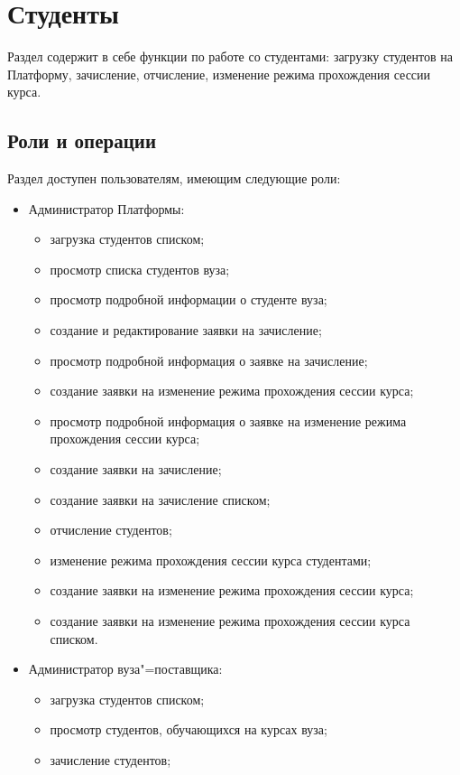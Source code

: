 \graphicspath{ {images/student/} }

\section{Студенты}

Раздел  содержит в себе функции по работе со студентами: загрузку студентов на Платформу, зачисление, 
отчисление, изменение режима прохождения сессии курса.

\subsection{Роли и операции}
Раздел доступен пользователям, имеющим следующие роли:
\begin{itemize}
	\item Администратор Платформы:
	\begin{itemize}
		\item загрузка студентов списком;
		\item просмотр списка студентов вуза;
		\item просмотр подробной информации о студенте вуза;
		\item создание и редактирование заявки на зачисление;
		\item просмотр подробной информация о заявке на зачисление;
		\item создание заявки на изменение режима прохождения сессии курса;
		\item просмотр подробной информация о заявке на изменение режима прохождения сессии курса;
		\item создание заявки на зачисление;
		\item создание заявки на зачисление списком;
		\item отчисление студентов;
		\item изменение режима прохождения сессии курса студентами;
		\item создание заявки на изменение режима прохождения сессии курса;
		\item создание заявки на изменение режима прохождения сессии курса списком.
	\end{itemize}
	\item Администратор вуза"=поставщика:
	\begin{itemize}
		\item загрузка студентов списком;
		\item просмотр студентов, обучающихся на курсах вуза;
		\item зачисление студентов;

\end{itemize}
\end{itemize}
